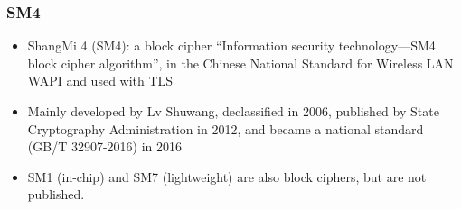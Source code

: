 \begin{frame}\frametitle{SM4}
\begin{itemize}
	\item ShangMi 4 (SM4): a block cipher ``Information security technology—SM4 block cipher algorithm'', in the Chinese National Standard for Wireless LAN WAPI and used with TLS
	\item Mainly developed by Lv Shuwang, declassified in 2006, published by State Cryptography Administration in 2012, and became a national standard (GB/T 32907-2016) in 2016
	\item SM1 (in-chip) and SM7 (lightweight) are also block ciphers, but are not published.
\end{itemize}
\begin{figure}
	\begin{center}
	\end{center}
	\end{figure}

\end{frame}
